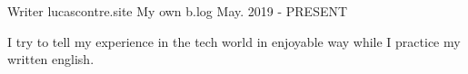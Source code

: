 

\begin{cventries}

  \cventry
    {Writer} %
    {lucascontre.site} %
    {My own b.log} %
    {May. 2019 - PRESENT} %
    {
      \begin{cvitems} %
        \item {I try to tell my experience in the tech world in enjoyable way while I practice my written english.}
      \end{cvitems}
    }

\end{cventries}
